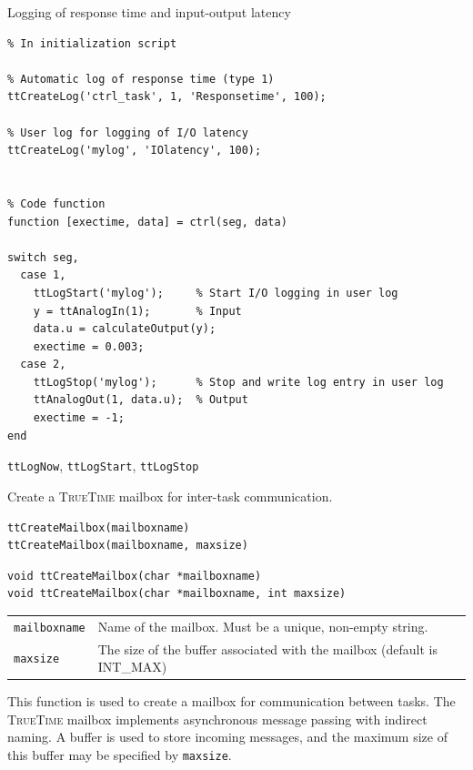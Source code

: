 \documentclass[final,twoside]{rapport}
\begin{document}
\example Logging of response time and input-output latency
\begin{small}
\begin{verbatim}
% In initialization script

% Automatic log of response time (type 1) 
ttCreateLog('ctrl_task', 1, 'Responsetime', 100);

% User log for logging of I/O latency 
ttCreateLog('mylog', 'IOlatency', 100);


% Code function
function [exectime, data] = ctrl(seg, data)

switch seg,
  case 1,
    ttLogStart('mylog');     % Start I/O logging in user log
    y = ttAnalogIn(1);       % Input
    data.u = calculateOutput(y);
    exectime = 0.003;
  case 2,
    ttLogStop('mylog');      % Stop and write log entry in user log
    ttAnalogOut(1, data.u);  % Output
    exectime = -1;
end
\end{verbatim}
\end{small}

\seealso
{\tt ttLogNow}, {\tt ttLogStart}, {\tt ttLogStop}



\purpose
Create a \textsc{TrueTime} mailbox for inter-task communication.

\Msyntax
\begin{verbatim}
ttCreateMailbox(mailboxname)
ttCreateMailbox(mailboxname, maxsize)
\end{verbatim}

\Csyntax
\begin{verbatim}
void ttCreateMailbox(char *mailboxname) 
void ttCreateMailbox(char *mailboxname, int maxsize) 
\end{verbatim}

\args
\begin{tabularx}{\hsize}{l>{\raggedright\arraybackslash}X}
  {\tt mailboxname} & Name of the mailbox. Must be a unique, non-empty
  string. \\
  {\tt maxsize} & The size of the buffer associated with the mailbox
  (default is INT\_MAX)
\end{tabularx}

\descr This function is used to create a mailbox for communication
between tasks. The \textsc{TrueTime} mailbox implements asynchronous
message passing with indirect naming. A buffer is used to store
incoming messages, and the maximum size of this buffer may be
specified by {\tt maxsize}.
\end{document}
